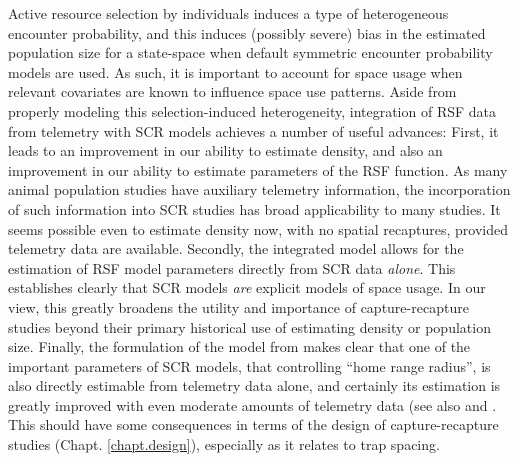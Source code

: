 

Active resource selection by individuals
induces a type of heterogeneous encounter probability, and this
induces (possibly severe) bias in the estimated population size for a
state-space when default symmetric
encounter probability models are used.
As such, it is important to account for space usage when relevant
covariates are known to influence space use patterns.
Aside from properly modeling this selection-induced heterogeneity, integration of RSF data from telemetry with SCR models achieves a
number of useful advances:
First, it
leads to an improvement in our ability to estimate density,
and also an improvement in our ability to estimate parameters of the
RSF function.  As many animal population studies have auxiliary
telemetry information, the incorporation of such information
into SCR studies has broad applicability to many studies.  It seems
possible even to estimate density now, with no spatial recaptures,
provided telemetry data are available.
Secondly,
the integrated model
allows for the estimation of RSF model parameters directly from SCR
data {\it alone}.  This establishes clearly that SCR models {\it are}
explicit models of space usage. In our view, this greatly broadens the
utility and importance of capture-recapture studies beyond their
primary historical use of estimating density or population
size. Finally, the formulation of the model from \citet{royle_etal:2012mee}
makes clear that one of the important parameters of SCR
models, that controlling ``home range radius'', is also directly
estimable from telemetry data alone, and certainly its estimation is
greatly improved with even moderate amounts of telemetry data (see
also \citet{sollmann_etal:2012ecol} and \citet{sollmann_etal:inprepjapplecol}.
This should have some consequences in terms of the design of capture-recapture
studies (Chapt. \ref{chapt.design}), especially as it relates to trap spacing.

